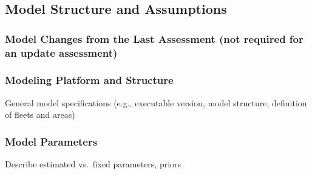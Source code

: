 \documentclass[11pt,
  english,
  a4paper,
]{article}
\begin{document}
\leavevmode\tagmcend\tagstructend


\hypertarget{model-structure-and-assumptions}{%
\subsection{Model Structure and Assumptions}\label{model-structure-and-assumptions}}

\leavevmode\tagmcend\tagstructend


\hypertarget{model-changes-from-the-last-assessment-not-required-for-an-update-assessment}{%
\subsubsection{Model Changes from the Last Assessment (not required for an update assessment)}\label{model-changes-from-the-last-assessment-not-required-for-an-update-assessment}}

\leavevmode\tagmcend\tagstructend


\hypertarget{modeling-platform-and-structure}{%
\subsubsection{Modeling Platform and Structure}\label{modeling-platform-and-structure}}

\leavevmode\tagmcend\tagstructend


General model specifications (e.g., executable version, model structure, definition of fleets and areas)

\leavevmode\tagmcend\tagstructend\par


\hypertarget{model-parameters}{%
\subsubsection{Model Parameters}\label{model-parameters}}

\leavevmode\tagmcend\tagstructend


Describe estimated vs.~fixed parameters, priors
\end{document}
